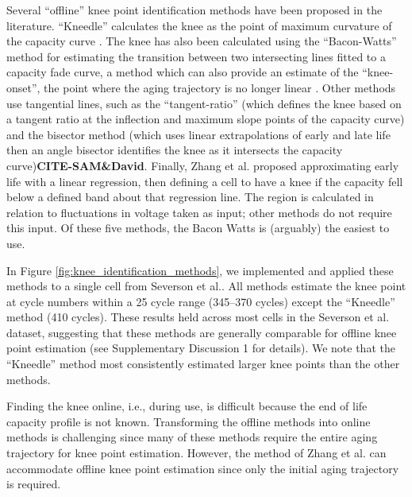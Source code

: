 \documentclass{article}
\newcommand{\cmark}{\textcolor{blue}{\textrm{\ding{52}}}}%
\newcommand{\gbox}[1]{{
\fbox{
\parbox{0.8\textwidth}{  \fbox{$\triangleright$\textcolor{blue}{\textbf{Gon}:}} 
#1
}}}}
\begin{document}
Several ``offline'' knee point identification methods have been proposed in the literature.
``Kneedle'' calculates the knee as the point of maximum curvature of the capacity curve \cite{satopaa_finding_2011}. The knee has also been calculated using the ``Bacon-Watts'' method for estimating the transition between two intersecting lines fitted to a capacity fade curve, a method which can also provide an estimate of the ``knee-onset'', the point where the aging trajectory is no longer linear \cite{fermin-cueto_identification_2020}. Other methods use tangential lines, such as the ``tangent-ratio'' (which defines the knee based on a tangent ratio at the inflection and maximum slope points of the capacity curve)\cite{diao_algorithm_2019} and the bisector method (which uses linear extrapolations of early and late life then an angle bisector identifies the knee as it intersects the capacity curve)\textbf{CITE-SAM\&David}. Finally, Zhang et al.\cite{zhang_accelerated_2019} proposed approximating early life with a linear regression, then defining a cell to have a knee if the capacity fell below a defined band about that regression line. The region is calculated in relation to fluctuations in voltage taken as input; other methods do not require this input. Of these five methods, the Bacon Watts is (arguably) the easiest to use.

In Figure \ref{fig:knee_identification_methods}, we implemented and applied these methods to a single cell from Severson et al.\cite{severson_data-driven_2019}. All methods estimate the knee point at cycle numbers within a 25 cycle range (345--370 cycles) except the ``Kneedle'' method (410 cycles). These results held across most cells in the Severson et al.\cite{severson_data-driven_2019} dataset, suggesting that these methods are generally comparable for offline knee point estimation (see Supplementary Discussion 1 for details). We note that the ``Kneedle'' method most consistently estimated larger knee points than the other methods.

Finding the knee online, i.e., during use, is difficult because the end of life capacity profile is not known. Transforming the offline methods into online methods is challenging since many of these methods require the entire aging trajectory for knee point estimation. However, the method of Zhang et al.\cite{zhang_accelerated_2019} can accommodate offline knee point estimation since only the initial aging trajectory is required.

\end{document}
